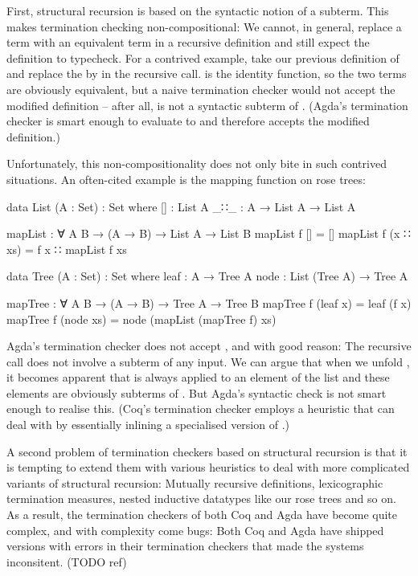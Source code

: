 First, structural recursion is based on the syntactic notion of a subterm. This
makes termination checking non-compositional: We cannot, in general, replace a
term with an equivalent term in a recursive definition and still expect the
definition to typecheck. For a contrived example, take our previous definition
of  and replace the  by  in the recursive call.
 is the identity function, so the two terms are obviously equivalent,
but a naive termination checker would not accept the modified definition --
after all,  is not a syntactic subterm of . (Agda's
termination checker is smart enough to evaluate  to  and
therefore accepts the modified definition.)

Unfortunately, this non-compositionality does not only bite in such contrived
situations. An often-cited example is the mapping function on rose trees:
\begin{code}
  data List (A : Set) : Set where
    []  : List A
    _∷_ : A → List A → List A

  mapList : ∀ {A B} → (A → B) → List A → List B
  mapList f []       = []
  mapList f (x ∷ xs) = f x ∷ mapList f xs

  data Tree (A : Set) : Set where
    leaf : A → Tree A
    node : List (Tree A) → Tree A

  mapTree : ∀ {A B} → (A → B) → Tree A → Tree B
  mapTree f (leaf x)  = leaf (f x)
  mapTree f (node xs) = node (mapList (mapTree f) xs)
\end{code}
Agda's termination checker does not accept , and with good
reason: The recursive call does not involve a subterm of any input. We can argue
that when we unfold , it becomes apparent that  is
always applied to an element of the list  and these elements are
obviously subterms of . But Agda's syntactic check is not smart enough
to realise this. (Coq's termination checker employs a heuristic that can deal
with  by essentially inlining a specialised version of
.)

A second problem of termination checkers based on structural recursion is that
it is tempting to extend them with various heuristics to deal with more
complicated variants of structural recursion: Mutually recursive definitions,
lexicographic termination measures, nested inductive datatypes like our rose
trees and so on. As a result, the termination checkers of both Coq and Agda have
become quite complex, and with complexity come bugs: Both Coq and Agda have
shipped versions with errors in their termination checkers that made the systems
inconsitent. (TODO ref)

